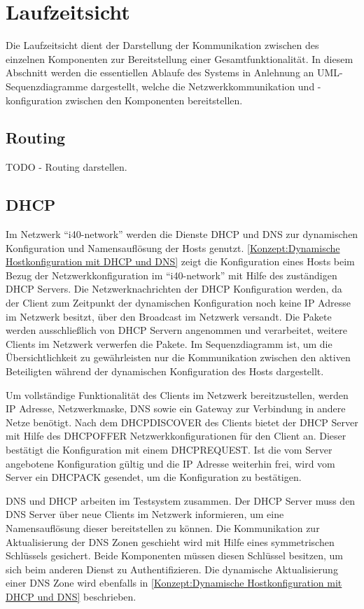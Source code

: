 \section{Laufzeitsicht}
Die Laufzeitsicht dient der Darstellung der Kommunikation zwischen des einzelnen Komponenten zur Bereitstellung einer Gesamtfunktionalität. In diesem Abschnitt werden die essentiellen Ablaufe des Systems in Anlehnung an \ac{UML}-Sequenzdiagramme dargestellt, welche die Netzwerkkommunikation und -konfiguration zwischen den Komponenten bereitstellen.

\subsection{Routing}
TODO - Routing darstellen.

\subsection{DHCP}
Im Netzwerk "`i40-network"' werden die Dienste \ac{DHCP} und \ac{DNS} zur dynamischen Konfiguration und Namensauflösung der Hosts genutzt. \autoref{Konzept:Dynamische Hostkonfiguration mit DHCP und DNS} zeigt die Konfiguration eines Hosts beim Bezug der Netzwerkkonfiguration im "`i40-network"' mit Hilfe des zuständigen \ac{DHCP} Servers. Die Netzwerknachrichten der \ac{DHCP} Konfiguration werden, da der Client zum Zeitpunkt der dynamischen Konfiguration noch keine \ac{IP} Adresse im Netzwerk besitzt, über den Broadcast im Netzwerk versandt. Die Pakete werden ausschließlich von \ac{DHCP} Servern angenommen und verarbeitet, weitere Clients im Netzwerk verwerfen die Pakete. Im Sequenzdiagramm ist, um die Übersichtlichkeit zu gewährleisten nur die Kommunikation zwischen den aktiven Beteiligten während der dynamischen Konfiguration des Hosts dargestellt.

Um vollständige Funktionalität des Clients im Netzwerk bereitzustellen, werden \ac{IP} Adresse, Netzwerkmaske, \ac{DNS} sowie ein Gateway zur Verbindung in andere Netze benötigt. Nach dem DHCPDISCOVER des Clients bietet der \ac{DHCP} Server mit Hilfe des DHCPOFFER Netzwerkkonfigurationen für den Client an. Dieser bestätigt die Konfiguration mit einem DHCPREQUEST. Ist die vom Server angebotene Konfiguration gültig und die \ac{IP} Adresse weiterhin frei, wird vom Server ein DHCPACK gesendet, um die Konfiguration zu bestätigen.

\ac{DNS} und \ac{DHCP} arbeiten im Testsystem zusammen. Der \ac{DHCP} Server muss den \ac{DNS} Server über neue Clients im Netzwerk informieren, um eine Namensauflösung dieser bereitstellen zu können. Die Kommunikation zur Aktualisierung der \ac{DNS} Zonen geschieht wird mit Hilfe eines symmetrischen Schlüssels gesichert. Beide Komponenten müssen diesen Schlüssel besitzen, um sich beim anderen Dienst zu Authentifizieren. Die dynamische Aktualisierung einer \ac{DNS} Zone wird ebenfalls in \autoref{Konzept:Dynamische Hostkonfiguration mit DHCP und DNS} beschrieben.

